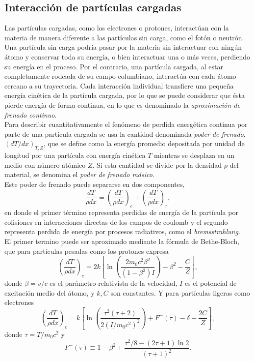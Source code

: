 \subsection{Interacción de partículas cargadas}

Las partículas cargadas, como los electrones o protones, interactúan con la materia de manera diferente a las partículas sin carga, como el fotón o neutrón. Una partícula sin carga podría pasar por la materia sin interactuar con ningún átomo y conservar toda su energía, o bien interactuar una o más veces, perdiendo su energía en el proceso. Por el contrario, una partícula cargada, al estar completamente rodeada de su campo columbiano, interactúa con cada átomo cercano a su trayectoria. Cada interacción individual transfiere una pequeña energía cinética de la partícula cargada, por lo que se puede considerar que ésta pierde energía de forma continua, en lo que es denominado la \textit{aproximación de frenado continuo}.\\

Para describir cuantitativamente el fenómeno de perdida energética continua por parte de una partícula cargada se usa la cantidad denominada \textit{poder de frenado}, $(dT/dx)_{T,Z}$, que se define como la energía promedio depositada por unidad de longitud por una partícula con energía cinética $T$ mientras se desplaza en un medio con número atómico $Z$. Si esta cantidad se divide por la densidad $\rho$ del material, se denomina el \textit{poder de frenado másico}.\\

Este poder de frenado puede separarse en dos componentes, 
\begin{equation}
	\frac{dT}{\rho dx}=\left(\frac{dT}{\rho dx}\right)_c+\left(\frac{dT}{\rho dx}\right)_r,
\end{equation}   
en donde el primer término representa perdidas de energía de la partícula por colisiones en interacciones directas de los campos de coulomb y el segundo representa perdida de energía por procesos radiativos, como el \textit{bremsstrahlung}.\\

El primer termino puede ser aproximado mediante la fórmula de Bethe-Bloch, que para partículas pesadas como los protones expresa
\begin{equation}
	\left(\frac{d T}{\rho d x}\right)_{c}=2 k\left[\ln \left(\frac{2 m_{0} c^{2} \beta^{2}}{\left(1-\beta^{2}\right) I}\right)-\beta^{2} -\frac{C}{Z}\right],
\end{equation}
donde $\beta=v/c$ es el parámetro relativista de la velocidad, $I$ es el potencial de excitación medio del átomo, y $k,C$ son constantes. Y para partículas ligeras como electrones
\begin{equation}\left(\frac{d T}{\rho d x}\right)_{c}=k\left[\ln \left(\frac{\tau^{2}(\tau+2)}{2\left(I / m_{0} c^{2}\right)^{2}}\right)+F^{-}(\tau)-\delta-\frac{2 C}{Z}\right],\end{equation}
donde $\tau=T/m_0c^2$ y 
\begin{equation}F^{-}(\tau) \equiv 1-\beta^{2}+\frac{\tau^{2} / 8-(2 \tau+1) \ln 2}{(\tau+1)^{2}}.\end{equation}\\

